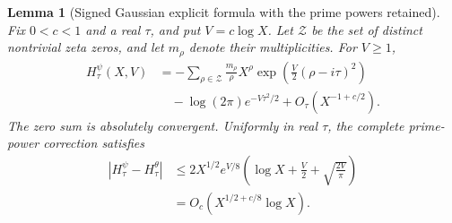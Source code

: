 \documentclass[11pt]{article}
\newtheorem{lemma}[theorem]{Lemma}
\theoremstyle{definition}
\begin{document}
\begin{lemma}[Signed Gaussian explicit formula with the prime powers retained]
\label{lem:greedy-prime-Gaussian-explicit}
Fix $0<c<1$ and a real $\tau$, and put $V=c\log X$.
Let $\mathcal Z$ be the set of distinct nontrivial zeta zeros,
and let $m_\rho$ denote their multiplicities.
For $V\ge1$,
\begin{equation}
 \begin{aligned}
 H_\tau^\psi(X,V)
   &=-\sum_{\rho\in\mathcal Z}
       \frac{m_\rho}{\rho}X^\rho
            \exp\left(\frac V2(\rho-i\tau)^2\right)\\
   &\quad-\log(2\pi)e^{-V\tau^2/2}
                 +O_\tau(X^{-1+c/2}).
 \end{aligned}
 \label{eq:greedy-prime-Gaussian-explicit}
\end{equation}
The zero sum is absolutely convergent.
Uniformly in real $\tau$, the complete prime-power correction satisfies
\begin{equation}
 \begin{aligned}
 |H_\tau^\psi-H_\tau^\theta|
 &\le
 2X^{1/2}e^{V/8}
       \left(\log X+\frac V2+\sqrt{\frac{2V}{\pi}}\right)\\
 &=O_c\left(X^{1/2+c/8}\log X\right).
 \end{aligned}
 \label{eq:greedy-prime-Gaussian-prime-powers}
\end{equation}
\end{lemma}
\end{document}
